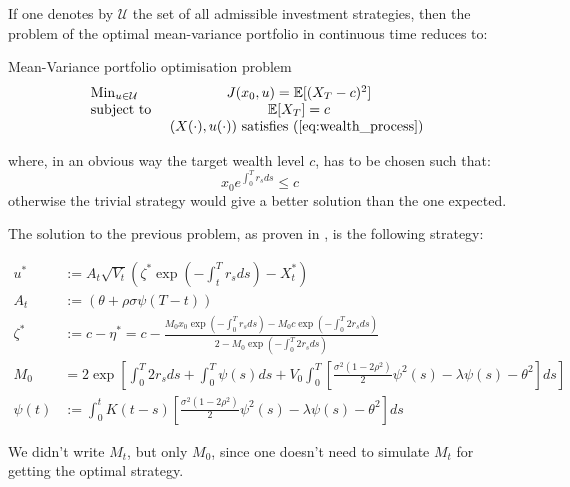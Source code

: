 If one denotes by $\mathcal U$ the set of all admissible investment strategies, then the problem of the optimal mean-variance portfolio in continuous time reduces to:


\begin{theoreme}{ Mean-Variance portfolio optimisation problem}
\begin{equation*}
\label{problem_of_portfolio}
\begin{array}{lc}
\operatorname*{Min}_{ u \in  \mathcal U }  & J(x_0, u) = \mathbb E [ ( X_T - c )^2 ]          \\
\text{subject to }   & \mathbb E [ X_T ] = c                             \\
                     & (X(\cdot), u(\cdot)) \text{ satisfies (\ref{eq:wealth_process})   }
\end{array}
\end{equation*}
\end{theoreme}

where, in an obvious way the target wealth level $c$, has to be chosen such that:
$$ x_0 e^{ \int_0^T  r_s ds } \leq c $$
otherwise the trivial strategy would give a better solution than the one expected. 

The solution to the previous problem, as proven in \cite{HanWong}, is the following strategy:

\begin{align}
u^* 
&:= A_t 
\sqrt{ V_t} 
\left ( \zeta^* \exp \left ( - \int_t^T r_s ds \right )  - X_t^* \right )  \label{eq:optimal_solution} \\
A_t 
&:= \left ( \theta + \rho \sigma \psi( T-t) \right ) \label{eq:At} \\
\zeta^* 
&:= c - \eta^* = c - \frac{
M_0 x_0 \exp \left ( -  \int_0^T r_s ds \right ) 
- M_0 c \exp \left ( -  \int_0^T 2 r_s ds \right )
}{
2 - M_0 \exp \left ( - \int_0^T 2 r_s ds  \right )
} \\
M_0 &= 2 \exp \left [ \int^T_0 2 r_s ds + \int_0^T \psi(s) ds + V_0 \int^T_0 [ \frac{\sigma^2 ( 1 - 2 \rho^2 ) }{2} \psi^2 ( s) - \lambda \psi (s) - \theta^2 ] ds \right ] \\
\psi(t) &:= \int_0^t K(t-s) \left [ \frac{\sigma^2 ( 1 - 2 \rho^2 ) }{2} \psi^2 ( s) - \lambda \psi (s) - \theta^2 \right ] ds \label{eq:ori_psi}
\end{align}

We didn't write $M_t$, but only $M_0$, since one doesn't need to simulate $M_t$ for getting the optimal strategy.



